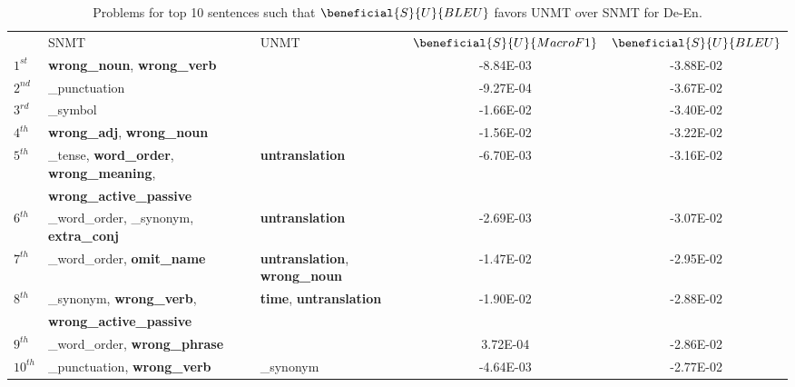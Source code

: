 \begin{table*}[t]
    \centering
    \footnotesize
    \begin{tabular}{lllcc}
    
 & SNMT  & UNMT & $\beneficial{S}{U}{MacroF1}$&$\beneficial{S}{U}{BLEU}$\\ 
$1^{st}$ &\textbf{wrong\_noun}, \textbf{wrong\_verb}	&&-8.84E-03&-3.88E-02\\
$2^{nd}$ &\_punctuation	&&-9.27E-04&-3.67E-02\\
$3^{rd}$ &\_symbol	&&-1.66E-02&-3.40E-02\\
$4^{th}$ &\textbf{wrong\_adj}, \textbf{wrong\_noun}	&&-1.56E-02&-3.22E-02\\
$5^{th}$ &\_tense, \textbf{word\_order}, \textbf{wrong\_meaning}, &	\textbf{untranslation}&-6.70E-03&-3.16E-02\\
&\textbf{wrong\_active\_passive} && \\
$6^{th}$ &\_word\_order, \_synonym, \textbf{extra\_conj}&	\textbf{untranslation}&-2.69E-03&-3.07E-02\\
$7^{th}$ &\_word\_order, \textbf{omit\_name}&	\textbf{untranslation}, \textbf{wrong\_noun}&-1.47E-02&-2.95E-02\\
$8^{th}$ &\_synonym, \textbf{wrong\_verb}, &	\textbf{time}, \textbf{untranslation}&-1.90E-02&-2.88E-02\\
&\textbf{wrong\_active\_passive} && \\
$9^{th}$ &\_word\_order, \textbf{wrong\_phrase}&&3.72E-04&-2.86E-02\\	
$10^{th}$ &\_punctuation, \textbf{wrong\_verb}&	\_synonym&-4.64E-03&-2.77E-02\\

    \end{tabular}%
    \caption{Problems for top 10 sentences such that $\beneficial{S}{U}{BLEU}$ favors UNMT over SNMT for De-En. }
    \label{tab:unmt_better_bleu}
\end{table*}
